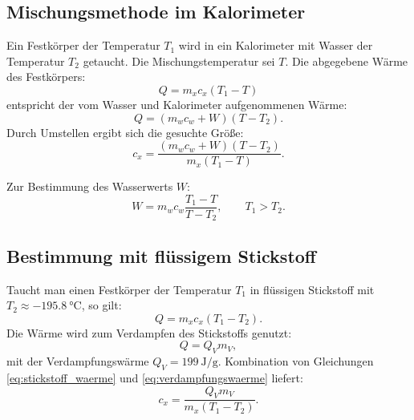 \subsection*{Mischungsmethode im Kalorimeter}
Ein Festkörper der Temperatur \(T_1\) wird in ein Kalorimeter mit Wasser der Temperatur \(T_2\) getaucht. Die Mischungstemperatur sei \(T\). Die abgegebene Wärme des Festkörpers:
\begin{equation}
    Q = m_x c_x (T_1 - T)
    \label{eq:waerme_festkoerper}
\end{equation}
entspricht der vom Wasser und Kalorimeter aufgenommenen Wärme:
\begin{equation}
    Q = (m_w c_w + W)(T - T_2).
    \label{eq:waerme_wasser}
\end{equation}
Durch Umstellen ergibt sich die gesuchte Größe:
\begin{equation}
    c_x = \frac{(m_w c_w + W)(T - T_2)}{m_x (T_1 - T)}.
    \label{eq:spezifische_kalorimeter}
\end{equation}

Zur Bestimmung des Wasserwerts \( W \):
\begin{equation}
    W = m_w c_w \frac{T_1 - T}{T - T_2}, \qquad T_1 > T_2.
    \label{eq:wasserwert}
\end{equation}

\subsection*{Bestimmung mit flüssigem Stickstoff}
Taucht man einen Festkörper der Temperatur \(T_1\) in flüssigen Stickstoff mit \(T_2 \approx \SI{-195.8}{\celsius}\), so gilt:
\begin{equation}
    Q = m_x c_x (T_1 - T_2).
    \label{eq:stickstoff_waerme}
\end{equation}
Die Wärme wird zum Verdampfen des Stickstoffs genutzt:
\begin{equation}
    Q = Q_V m_V,
    \label{eq:verdampfungswaerme}
\end{equation}
mit der Verdampfungswärme \( Q_V = \SI{199}{\joule\per\gram} \). Kombination von Gleichungen \hyperref[eq:stickstoff_waerme]{\ref*{eq:stickstoff_waerme}} und \hyperref[eq:verdampfungswaerme]{\ref*{eq:verdampfungswaerme}} liefert:
\begin{equation}
    c_x = \frac{Q_V m_V}{m_x (T_1 - T_2)}.
    \label{eq:stickstoff_cx}
\end{equation}


